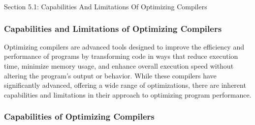 \begin{notes}{Section 5.1: Capabilities And Limitations Of Optimizing Compilers}
    \subsubsection*{Capabilities and Limitations of Optimizing Compilers}

    Optimizing compilers are advanced tools designed to improve the efficiency and performance of programs by transforming code in ways that reduce execution time, minimize memory usage, and enhance 
    overall execution speed without altering the program's output or behavior. While these compilers have significantly advanced, offering a wide range of optimizations, there are inherent capabilities 
    and limitations in their approach to optimizing program performance. \vspace*{1em}
    
    \subsubsection*{Capabilities of Optimizing Compilers}
    

\end{notes}
